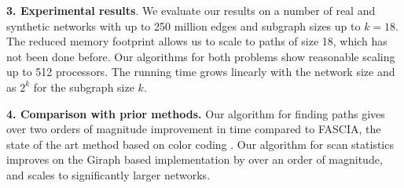 \noindent
\textbf{3. Experimental results}. We evaluate our results on a number of real and synthetic networks 
with up to 250 million edges and subgraph sizes up to $k=18$. The reduced memory footprint
allows us to scale to paths of size 18, which has not been done before.  Our algorithms for
both problems show reasonable scaling up to 512 processors. The running time grows linearly
with the network size and as $2^k$ for the subgraph size $k$.

\noindent
\textbf{4. Comparison with prior methods.}
Our algorithm for finding paths gives over two orders of magnitude improvement in time
compared to FASCIA, the state of the art method based on color coding \cite{slota:icpp13, slota:ipdps14}.
Our algorithm for scan statistics improves on the Giraph based implementation
\cite{cadena:bigdata17} by over an order of magnitude, and scales to significantly larger networks.


%
%

